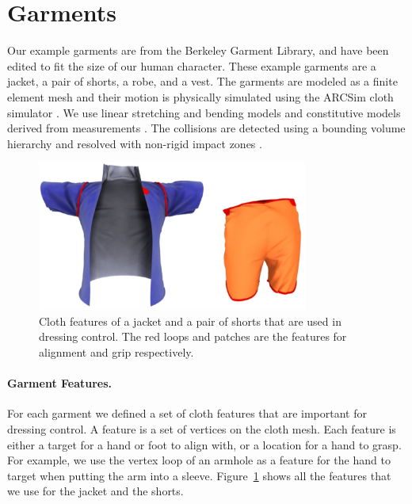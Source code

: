 \section{Garments}

Our example garments are from the Berkeley Garment Library, and have been
edited to fit the size of our human character.  These example garments
are a jacket, a pair of shorts, a robe, and a vest.
The garments are modeled as a finite element mesh and their motion is
physically simulated
using the ARCSim cloth simulator \cite{Narain:2012:AAR}. We use linear
stretching and bending models and constitutive models derived from
measurements \cite{Wang:2011}. The collisions are detected using a
bounding volume hierarchy \cite{Tang:2010} and resolved with non-rigid
impact zones \cite{Harmon:2008}.

\begin{figure}[!t]
  \centering
  \includegraphics[width=3.5in]{images/features}
  \caption{Cloth features of a jacket and a pair of shorts that are used in dressing control. The red loops and patches are the features for alignment and grip respectively.}
  \label{fig:features}
\end{figure}


\paragraph{Garment Features.} For each garment we defined a set of cloth
features that are important for dressing control. A feature is a set of
vertices on the cloth mesh.  Each feature is either a target for a hand or
foot to align with, or a location for a hand to grasp.  For example, we
use the vertex loop of an armhole as a feature for the hand to target when
putting the arm into a sleeve.  Figure~\ref{fig:features} shows all the
features that we use for the jacket and the shorts.
